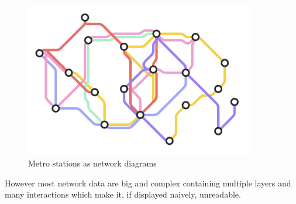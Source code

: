 \begin{figure}[H]
\centering
\captionsetup{justification=centering}
\includegraphics[width=0.9\textwidth]{Report-latex/tex_files/pics/network1.png}
\caption{Metro stations as network diagrams \cite{metro} }
\label{fig:metro}
\end{figure}

However most network data are big and complex containing multiple layers and many interactions which make it, if displayed naively, unreadable. 

